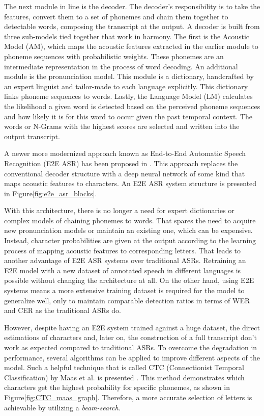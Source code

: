 The next module in line is the decoder. The decoder's responsibility is to take the features, convert them to a set of phonemes and chain them together to detectable words, composing the transcript at the output.
A decoder is built from three sub-models tied
together that work in harmony. 
The first is the Acoustic Model (AM), which maps the acoustic features extracted in the earlier module to phoneme sequences with probabilistic weights.
These phonemes are an intermediate representation in the process of word decoding.
An additional module is the pronunciation model. This module is a dictionary, handcrafted by an expert linguist and tailor-made to each language explicitly.
This dictionary links phoneme sequences
to words. 
Lastly, the Language Model (LM) calculates the likelihood a given word is detected based on the perceived phoneme sequences and how likely it is for this word to occur given the past temporal context.
The words or N-Grams with the highest scores are selected and written into the output transcript.

A newer more modernized approach known as 
End-to-End Automatic Speech
Recognition (E2E ASR) has been proposed 
in \cite{pmlr-v32-graves14}. This approach 
replaces the conventional decoder structure with 
a deep neural network of some kind that maps 
acoustic features to characters. An E2E ASR system
structure is presented in Figure\;\ref{fig:e2e_asr_blocks}.

With this architecture, there is no longer a need for expert 
dictionaries or complex models of chaining phonemes to words.
That spares the need to acquire new pronunciation models or maintain an existing one, which can be expensive. 
Instead, character probabilities 
are given at the output according to the learning
process of mapping acoustic features to 
corresponding letters.
That leads to another advantage of E2E ASR systems
over traditional ASRs. 
Retraining an E2E model with 
a new dataset of annotated speech in different 
languages is possible without changing the architecture at all.
On the other hand, 
using E2E systems means a more extensive training dataset is 
required for the model to generalize well, 
only to maintain comparable detection 
ratios in terms of WER and CER as the traditional ASRs do.

However, despite having an E2E system trained against a huge dataset, the direct estimations of characters and, later on, the construction of a full 
transcript don't work as expected compared to traditional ASRs.
To overcome the degradation in performance, several algorithms
can be applied to improve different aspects of the model.
Such a helpful technique that is 
called CTC (Connectionist Temporal Classification) 
by Maas et al. is presented \cite{maas-etal-2015-lexicon}.
This method demonstrates which characters get the highest 
probability for specific phonemes, 
as shown in
Figure\;\ref{fig:CTC_maas_graph}. 
Therefore, a more accurate selection of 
letters is achievable by utilizing a \emph{beam-search}.

